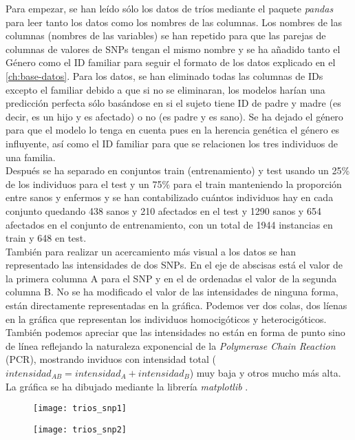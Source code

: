 Para empezar, se han leído sólo los datos de tríos mediante el paquete \textit{pandas} \cite{mckinney-proc-scipy-2010} para leer tanto los datos como los nombres de las columnas. Los nombres de las columnas (nombres de las variables) se han repetido para que las parejas de columnas de valores de SNPs tengan el mismo nombre y se ha añadido tanto el Género como el ID familiar para seguir el formato de los datos explicado en el \autoref{ch:base-datos}. Para los datos, se han eliminado todas las columnas de IDs excepto el familiar debido a que si no se eliminaran, los modelos harían una predicción perfecta sólo basándose en si el sujeto tiene ID de padre y madre (es decir, es un hijo y es afectado) o no (es padre y es sano). Se ha dejado el género para que el modelo lo tenga en cuenta pues en la herencia genética el género es influyente, así como el ID familiar para que se relacionen los tres individuos de una familia.\\
Después se ha separado en conjuntos train (entrenamiento) y test usando un 25\% de los individuos para el test y un 75\% para el train manteniendo la proporción entre sanos y enfermos y se han contabilizado cuántos individuos hay en cada conjunto quedando 438 sanos y 210 afectados en el test y 1290 sanos y 654 afectados en el conjunto de entrenamiento, con un total de 1944 instancias en train y 648 en test.\\
También para realizar un acercamiento más visual a los datos se han representado las intensidades de dos SNPs. En el eje de abscisas está el valor de la primera columna A para el SNP y en el de ordenadas el valor de la segunda columna B. No se ha modificado el valor de las intensidades de ninguna forma, están directamente representadas en la gráfica. Podemos ver dos colas, dos líenas en la gráfica que representan los individuos homocigóticos y heterocigóticos. También podemos apreciar que las intensidades no están en forma de punto sino de línea reflejando la naturaleza exponencial de la \textit{Polymerase Chain Reaction} (PCR), mostrando inviduos con intensidad total ($intensidad_{AB}=intensidad_{A}+intensidad_{B}$) muy baja y otros mucho más alta. La gráfica se ha dibujado mediante la librería \textit{matplotlib} \cite{Hunter:2007}.

\begin{figure}[H]
\centering
\begin{minipage}{.5\textwidth}
  \centering
  \texttt{[image: trios\_snp1]}
  \label{fig:snp1-trios}
\end{minipage}%
\begin{minipage}{.5\textwidth}
  \centering
  \texttt{[image: trios\_snp2]}
  \label{fig:snp2-trios}
\end{minipage}
\end{figure}

